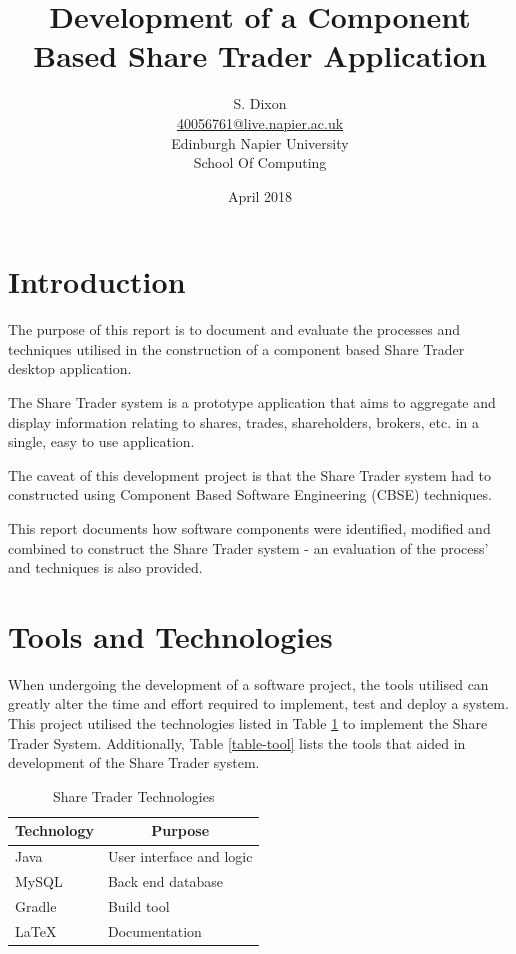 \documentclass[12pt, a4paper,titlepage]{article}
\title{Development of a Component Based Share Trader Application}
\author{S. Dixon
        \\\href{mailto:40056761@live.napier.ac.uk}{40056761@live.napier.ac.uk}
        \\Edinburgh Napier University
        \\School Of Computing
        \\}
\date{April 2018}
\begin{document}
\maketitle

\tableofcontents
\newpage


\section{Introduction}
The purpose of this report is to document and evaluate the processes and
techniques utilised in the construction of a component based Share Trader
desktop application.

The Share Trader system is a prototype application that aims to aggregate and
display information relating to shares, trades, shareholders, brokers, etc. in
a single, easy to use application. 

The caveat of this development project is that the Share Trader system had to
constructed using Component Based Software Engineering (CBSE) techniques.

This report documents how software components were identified, modified and
combined to construct the Share Trader system - an evaluation of the process'
and techniques is also provided.


\section{Tools and Technologies}
When undergoing the development of a software project, the tools utilised can
greatly alter the time and effort required to implement, test and deploy a
system.
This project utilised the technologies listed in Table \ref{table-tech} to
implement the Share Trader System.
Additionally, Table \ref{table-tool} lists the tools that aided in development
of the Share Trader system.

\begin{table}[h]
    \centering
    \begin{tabular}{|l|l|}
        \hline
        \textbf{Technology}  & \multicolumn{1}{c|}{\textbf{Purpose}} \\ \hline
        Java        & User interface and logic     \\ \hline
        MySQL       & Back end database            \\ \hline
        Gradle      & Build tool                   \\ \hline
        \LaTeX      & Documentation                \\ \hline
    \end{tabular}
    \caption{Share Trader Technologies}
    \label{table-tech}
\end{table}
\end{document}
